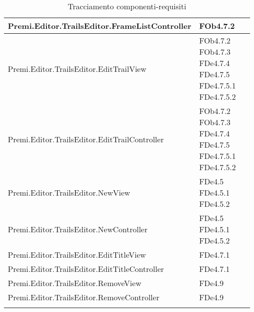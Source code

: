 \begin{longtable}{|p{10cm}|p{4cm}|}
\hline
Premi.Editor.TrailsEditor.FrameListController & FOb4.7.2 \linebreak \\
\hline
Premi.Editor.TrailsEditor.EditTrailView & FOb4.7.2 \linebreak FOb4.7.3 \linebreak FDe4.7.4 \linebreak FDe4.7.5 \linebreak FDe4.7.5.1 \linebreak FDe4.7.5.2 \linebreak \\
\hline
Premi.Editor.TrailsEditor.EditTrailController & FOb4.7.2 \linebreak FOb4.7.3 \linebreak FDe4.7.4 \linebreak FDe4.7.5 \linebreak FDe4.7.5.1 \linebreak FDe4.7.5.2 \linebreak \\
\hline
Premi.Editor.TrailsEditor.NewView & FDe4.5 \linebreak FDe4.5.1 \linebreak FDe4.5.2 \linebreak \\
\hline
Premi.Editor.TrailsEditor.NewController & FDe4.5 \linebreak FDe4.5.1 \linebreak FDe4.5.2 \linebreak \\
\hline
Premi.Editor.TrailsEditor.EditTitleView & FDe4.7.1 \linebreak \\
\hline
Premi.Editor.TrailsEditor.EditTitleController & FDe4.7.1 \linebreak \\
\hline
Premi.Editor.TrailsEditor.RemoveView & FDe4.9 \linebreak \\
\hline
Premi.Editor.TrailsEditor.RemoveController & FDe4.9 \linebreak \\
\hline
\caption{Tracciamento componenti-requisiti}
\end{longtable}